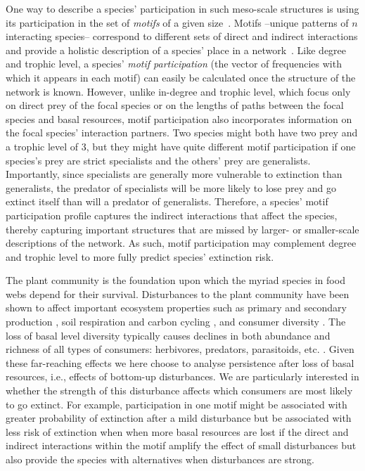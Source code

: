 \documentclass[12pt]{article}
\begin{document}
\begin{spacing}{2.0}
    
    One way to describe a species' participation in such meso-scale structures is using its participation in the set of \emph{motifs} of a given size~\citep{Cirtwill2015a,Cirtwill2018FoodWebs}.
    Motifs --unique patterns of $n$ interacting species-- correspond to different sets of direct and indirect interactions and provide a holistic description of a species' place in a network~\citep{Stouffer2007,Stouffer2012}.
    Like degree and trophic level, a species' \emph{motif participation} (the vector of frequencies with which it appears in each motif) can easily be calculated once the structure of the network is known.
    However, unlike in-degree and trophic level, which focus only on direct prey of the focal species or on the lengths of paths between the focal species and basal resources, motif participation also incorporates information on the focal species' interaction partners.
    Two species might both have two prey and a trophic level of 3, but they might have quite different motif participation if one species's prey are strict specialists and the others' prey are generalists.
    Importantly, since specialists are generally more vulnerable to extinction than generalists, the predator of specialists will be more likely to lose prey and go extinct itself than will a predator of generalists.
    Therefore, a species' motif participation profile captures the indirect interactions that affect the species, thereby capturing important structures that are missed by larger- or smaller-scale descriptions of the network.
    As such, motif participation may complement degree and trophic level to more fully predict species' extinction risk.
    
    
    The plant community is the foundation upon which the myriad species in food webs depend for their survival. 
    Disturbances to the plant community have been shown to affect important ecosystem properties such as primary \citep{Hector1999} and secondary production \citep{borer2012plant}, soil respiration and carbon cycling \citep{chen2019plant}, and consumer diversity \citep{scherber2010bottom, Baiser2016,li2020bottom}.
    The loss of  basal level diversity typically causes declines in both abundance and richness of all types of consumers: herbivores, predators, parasitoids, etc. \citep{scherber2010bottom,Dobson2009food, Mduma1999food, Georgiadis2007}. 
    Given these far-reaching effects we here choose to analyse persistence after loss of basal resources, i.e., effects of bottom-up disturbances. 
    We are particularly interested in whether the strength of this disturbance affects which consumers are most likely to go extinct. 
    For example, participation in one motif might be associated with greater probability of extinction after a mild disturbance but be associated with less risk of extinction when when more basal resources are lost if the direct and indirect interactions within the motif amplify the effect of small disturbances but also provide the species with alternatives when disturbances are strong.


\end{spacing}
\end{document}
